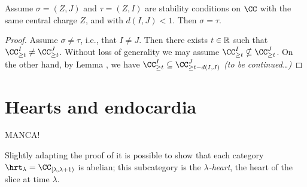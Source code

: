 \begin{lemma}
Assume $\sigma= (Z,J)$ and $\tau = (Z,I)$ are stability conditions
on $\CC$ with the same central charge $Z$, and with $d(I,J) < 1$. Then $\sigma=\tau$.
\end{lemma}
\begin{proof}
Assume $\sigma\neq \tau$, i.e., that $I\neq J$. Then there exists $t\in\mathbb{R}$ such that $\CC_{\geq t}^I\neq \CC_{\geq t}^J$. Without loss of generality we may assume $\CC_{\geq t}^I\nsubseteq \CC_{\geq t}^J$. On the other hand, by Lemma , we have $\CC_{\geq t}^I\subseteq \CC_{\geq t-d(I,J)}^J$ {\it(to be continued\dots)}
\end{proof}

\section{Hearts and endocardia}\label{hearts.endocar}
\epigraph{MANCA!}{}

\index{ab-endocardium@$[a,b)$\hyp{}endocardium}
Slightly adapting the proof of \athm {} it is possible to show that each category $\hrt_\lambda = \CC_{[\lambda,\lambda+1)}$ is abelian; this subcategory is the $\lambda$\emph{\hyp{}heart}, \ie the heart of the slice at time $\lambda$.

